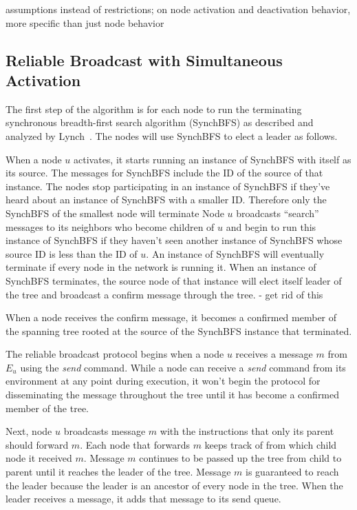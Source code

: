 \documentclass[english]{article}
\begin{document}
assumptions instead of restrictions; on node activation and deactivation behavior, more specific than just node behavior

  \subsection {Reliable Broadcast with Simultaneous Activation}

The first step of the algorithm is for each node to run the terminating synchronous breadth-first search algorithm (SynchBFS) as described and analyzed by Lynch~\cite{Lynch:1996}. The nodes will use SynchBFS to elect a leader as follows.

When a node $u$ activates, it starts running an instance of SynchBFS with itself as its source. 
The messages for SynchBFS include the ID of the source of that instance. The nodes stop participating in an instance of SynchBFS if they've heard about an instance of SynchBFS with a smaller ID. Therefore only the SynchBFS of the smallest node will terminate
Node $u$ broadcasts ``search'' messages to its neighbors who become children of $u$ and begin to run this instance of SynchBFS if they haven't seen another instance of SynchBFS whose source ID is less than the ID of $u$. An instance of SynchBFS will eventually terminate if every node in the network is running it. When an instance of SynchBFS terminates, the source node of that instance will elect itself leader of the tree and broadcast a confirm message through the tree. - get rid of this

 When a node receives the confirm message, it becomes a confirmed member of the spanning tree rooted at the source of the SynchBFS instance that terminated. 


The reliable broadcast protocol begins when a node $u$ receives a message $m$ from $E_u$ using the \textit{send} command. While a node can receive a \textit{send} command from its environment at any point during execution, it won't begin the protocol for disseminating the message throughout the tree until it has become a confirmed member of the tree.

Next, node $u$ broadcasts message $m$ with the instructions that only its parent should forward $m$. Each node that forwards $m$ keeps track of from which child node it received $m$. Message $m$ continues to be passed up the tree from child to parent until it reaches the leader of the tree. Message $m$ is guaranteed to reach the leader because the leader is an ancestor of every node in the tree. When the leader receives a message, it adds that message to its send queue.
\end{document}
